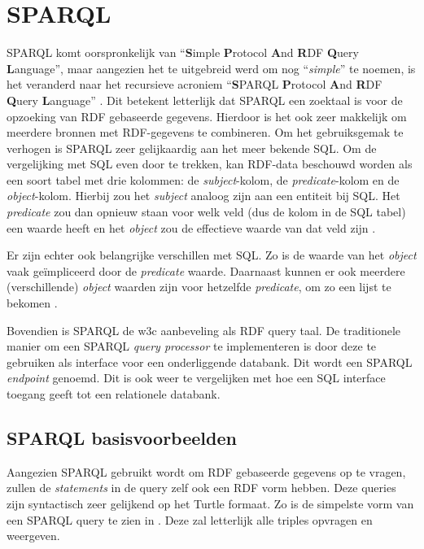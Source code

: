 \section{SPARQL}
\label{sec:sparql}

SPARQL komt oorspronkelijk van ``\textbf{S}imple \textbf{P}rotocol \textbf{A}nd \textbf{R}DF \textbf{Q}uery \textbf{L}anguage'', maar aangezien het te uitgebreid werd om nog ``\textit{simple}'' te noemen, is het veranderd naar het recursieve acroniem ``\textbf{S}PARQL \textbf{P}rotocol \textbf{A}nd \textbf{R}DF \textbf{Q}uery \textbf{L}anguage'' \cite{sparql2011acronym}. Dit betekent letterlijk dat SPARQL een zoektaal is voor de opzoeking van RDF gebaseerde gegevens. Hierdoor is het ook zeer makkelijk om meerdere bronnen met RDF-gegevens te combineren. Om het gebruiksgemak te verhogen is SPARQL zeer gelijkaardig aan het meer bekende SQL. Om de vergelijking met SQL even door te trekken, kan RDF-data beschouwd worden als een soort tabel met drie kolommen: de \textit{subject}-kolom, de \textit{predicate}-kolom en de \textit{object}-kolom. Hierbij zou het \textit{subject} analoog zijn aan een entiteit bij SQL. Het \textit{predicate} zou dan opnieuw staan voor welk veld (dus de kolom in de SQL tabel) een waarde heeft en het \textit{object} zou de effectieve waarde van dat veld zijn \cite{sparql2013querylanguage}. 

Er zijn echter ook belangrijke verschillen met SQL. Zo is de waarde van het \textit{object} vaak geïmpliceerd door de \textit{predicate} waarde. Daarnaast kunnen er ook meerdere (verschillende) \textit{object} waarden zijn voor hetzelfde \textit{predicate}, om zo een lijst te bekomen \cite{sparql2013querylanguage}.

Bovendien is SPARQL de \acrshort{w3c} aanbeveling als RDF query taal. De traditionele manier om een SPARQL \textit{query processor} te implementeren is door deze te gebruiken als interface voor een onderliggende databank. Dit wordt een SPARQL \textit{endpoint} genoemd. Dit is ook weer te vergelijken met hoe een SQL interface toegang geeft tot een relationele databank.

\subsection{SPARQL basisvoorbeelden}

Aangezien SPARQL gebruikt wordt om RDF gebaseerde gegevens op te vragen, zullen de \textit{statements} in de query zelf ook een RDF vorm hebben. Deze queries zijn syntactisch zeer gelijkend op het Turtle formaat. Zo is de simpelste vorm van een SPARQL query te zien in . Deze zal letterlijk alle triples opvragen en weergeven. 

